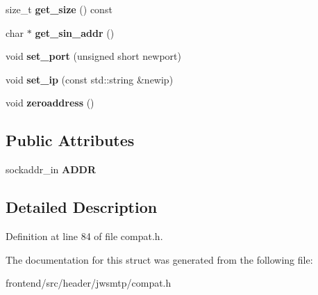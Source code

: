 \begin{DoxyCompactItemize}
\item 
\hypertarget{structjwsmtp_1_1SOCKADDR__IN_a2fa14b8fb4f89917920c8f48db1af9e5}{size\-\_\-t {\bfseries get\-\_\-size} () const }\label{structjwsmtp_1_1SOCKADDR__IN_a2fa14b8fb4f89917920c8f48db1af9e5}

\item 
\hypertarget{structjwsmtp_1_1SOCKADDR__IN_a85af8047968eec8bb4d534f30cb120ba}{char $\ast$ {\bfseries get\-\_\-sin\-\_\-addr} ()}\label{structjwsmtp_1_1SOCKADDR__IN_a85af8047968eec8bb4d534f30cb120ba}

\item 
\hypertarget{structjwsmtp_1_1SOCKADDR__IN_aa64b304782ebcec318d12b6e4137de0b}{void {\bfseries set\-\_\-port} (unsigned short newport)}\label{structjwsmtp_1_1SOCKADDR__IN_aa64b304782ebcec318d12b6e4137de0b}

\item 
\hypertarget{structjwsmtp_1_1SOCKADDR__IN_aa5a98e0ccbe4c286b944de1bcc75d9c5}{void {\bfseries set\-\_\-ip} (const std\-::string \&newip)}\label{structjwsmtp_1_1SOCKADDR__IN_aa5a98e0ccbe4c286b944de1bcc75d9c5}

\item 
\hypertarget{structjwsmtp_1_1SOCKADDR__IN_a3c825338ac7bd9b2d0dcf7514dfaaa2a}{void {\bfseries zeroaddress} ()}\label{structjwsmtp_1_1SOCKADDR__IN_a3c825338ac7bd9b2d0dcf7514dfaaa2a}

\end{DoxyCompactItemize}
\subsection*{Public Attributes}
\begin{DoxyCompactItemize}
\item 
\hypertarget{structjwsmtp_1_1SOCKADDR__IN_ad23415107871375647977a3ac0a897a4}{sockaddr\-\_\-in {\bfseries A\-D\-D\-R}}\label{structjwsmtp_1_1SOCKADDR__IN_ad23415107871375647977a3ac0a897a4}

\end{DoxyCompactItemize}


\subsection{Detailed Description}


Definition at line 84 of file compat.\-h.



The documentation for this struct was generated from the following file\-:\begin{DoxyCompactItemize}
\item 
frontend/src/header/jwsmtp/compat.\-h\end{DoxyCompactItemize}
